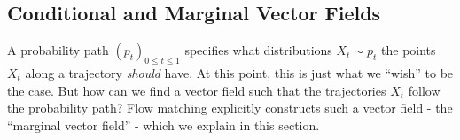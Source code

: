 


\subsection{Conditional and Marginal Vector Fields}

A probability path $(p_t)_{0\leq t\leq 1}$ specifies what distributions $X_t\sim p_t$ the points $X_t$ along a trajectory \emph{should} have. At this point, this is just what we ``wish'' to be the case. But how can we find a vector field such that the trajectories $X_t$ follow the probability path? Flow matching explicitly constructs such a vector field - the ``marginal vector field'' - which we explain in this section.

